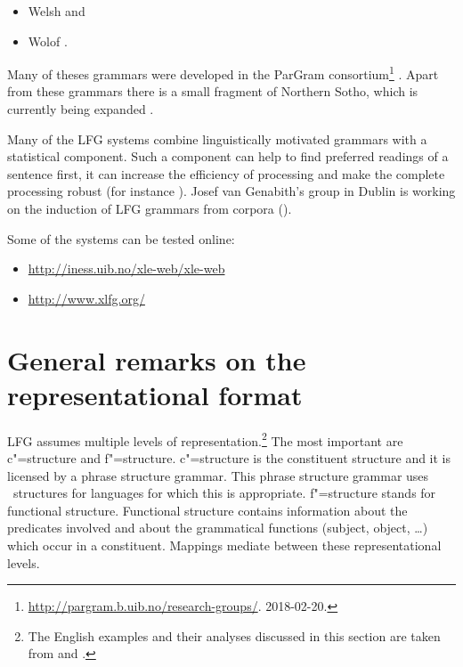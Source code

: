 \begin{itemize}
\item Welsh \citep{MS2005a-u}
and
\item Wolof \citep{Dione2012b-u,Dione2013a-u}.
\end{itemize}
Many of theses grammars were developed in the ParGram consortium\footnote{%
  \url{http://pargram.b.uib.no/research-groups/}. 2018-02-20.
} \citep*{BKNS99a-ed,BDKMR02a-u}. Apart from these grammars there is a small fragment of Northern
Sotho, which is currently being expanded \citep{Faasz2010a-u}. 


Many of the LFG systems combine linguistically motivated grammars with a statistical
component. Such a component can help to find preferred readings of a sentence first,
it can increase the efficiency of processing and make the complete processing robust (for instance
\citealp{KRKMVC2004a-u,RKKCMJ2002a-u}). Josef van Genabith's group in Dublin is working on the induction of
LFG grammars from corpora (\eg \citealp{JGCCR99a-u,DBCGW2005a-u,CBFDRCW2005a-u,CG2006a-u,GWG2007a-u,CBDRGW2008a-u,SvG2009a-u}). 

\pagebreak
Some of the systems can be tested online:
\begin{itemize}
\item \url{http://iness.uib.no/xle-web/xle-web}

\item \url{http://www.xlfg.org/}
\end{itemize}




\section{General remarks on the representational format}
\label{Abschnitt-Format-LFG}

LFG assumes multiple levels of representation.\footnote{%
	The English examples and their analyses discussed in this section are taken from
        \citet{Dalrymple2001a-u} and \citet{Dalrymple2006a}.
} The most important are c"=structure and f"=structure. c"=structure is the constituent
structure and it is licensed by a phrase structure grammar. This phrase structure grammar uses
\xbar~structures for languages for which this is appropriate. f"=structure stands for functional structure. Functional structure contains information about the predicates involved
and about the grammatical functions (subject, object, \ldots) which occur in a constituent. Mappings
mediate between these representational levels.



